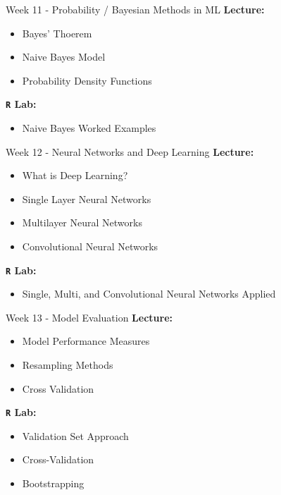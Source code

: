 \documentclass[aspectratio=169,xcolor=dvipsnames]{beamer}
\begin{document}
\begin{frame}{Week 11 - Probability / Bayesian Methods in ML}
    \textbf{Lecture:}
    \begin{itemize}
        \setlength{\itemsep}{.25cm}
        \item Bayes' Thoerem
        \item Naive Bayes Model
        \item Probability Density Functions
    \end{itemize}
\textbf{\texttt{R} Lab:}
    \begin{itemize}
    \setlength{\itemsep}{.25cm}
        \item Naive Bayes Worked Examples
    \end{itemize}
\end{frame}

\begin{frame}{Week 12 - Neural Networks and Deep Learning}
    \textbf{Lecture:}
    \begin{itemize}
        \setlength{\itemsep}{.25cm}
        \item What is Deep Learning?
        \item Single Layer Neural Networks
        \item Multilayer Neural Networks
        \item Convolutional Neural Networks
    \end{itemize}
\textbf{\texttt{R} Lab:}
    \begin{itemize}
    \setlength{\itemsep}{.25cm}
        \item Single, Multi, and Convolutional Neural Networks Applied
    \end{itemize}
\end{frame}

\begin{frame}{Week 13 - Model Evaluation}
    \textbf{Lecture:}
    \begin{itemize}
        \setlength{\itemsep}{.25cm}
        \item Model Performance Measures
        \item Resampling Methods
        \item Cross Validation
    \end{itemize}
\textbf{\texttt{R} Lab:}
    \begin{itemize}
    \setlength{\itemsep}{.25cm}
        \item Validation Set Approach
        \item Cross-Validation
        \item Bootstrapping
    \end{itemize}
\end{frame}
\end{document}
